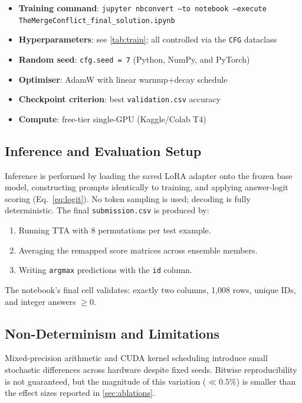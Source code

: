 \documentclass[11pt,twocolumn]{article}
\begin{document}
\begin{keybox}
\small
\begin{itemize}[leftmargin=*, noitemsep, topsep=0pt]
  \item \textbf{Training command}: \texttt{jupyter nbconvert --to notebook --execute TheMergeConflict\_final\_solution.ipynb}
  \item \textbf{Hyperparameters}: see \ref{tab:train}; all controlled via the \texttt{CFG} dataclass
  \item \textbf{Random seed}: \texttt{cfg.seed = 7} (Python, NumPy, and PyTorch)
  \item \textbf{Optimiser}: AdamW with linear warmup+decay schedule
  \item \textbf{Checkpoint criterion}: best \texttt{validation.csv} accuracy
  \item \textbf{Compute}: free-tier single-GPU (Kaggle/Colab T4)
\end{itemize}
\end{keybox}

\subsection{Inference and Evaluation Setup}

Inference is performed by loading the saved LoRA adapter onto the frozen base model, constructing prompts identically to training, and applying answer-logit scoring (Eq.~\ref{eq:logit}). No token sampling is used; decoding is fully deterministic. The final \texttt{submission.csv} is produced by:
\begin{enumerate}[leftmargin=*, noitemsep, topsep=2pt]
  \item Running TTA with 8 permutations per test example.
  \item Averaging the remapped score matrices across ensemble members.
  \item Writing \texttt{argmax} predictions with the \texttt{id} column.
\end{enumerate}
The notebook's final cell validates: exactly two columns, 1,008 rows, unique IDs, and integer answers $\geq 0$.

\subsection{Non-Determinism and Limitations}

Mixed-precision arithmetic and CUDA kernel scheduling introduce small stochastic differences across hardware despite fixed seeds. Bitwise reproducibility is not guaranteed, but the magnitude of this variation ($\ll 0.5\%$) is smaller than the effect sizes reported in \ref{sec:ablations}.
\end{document}
